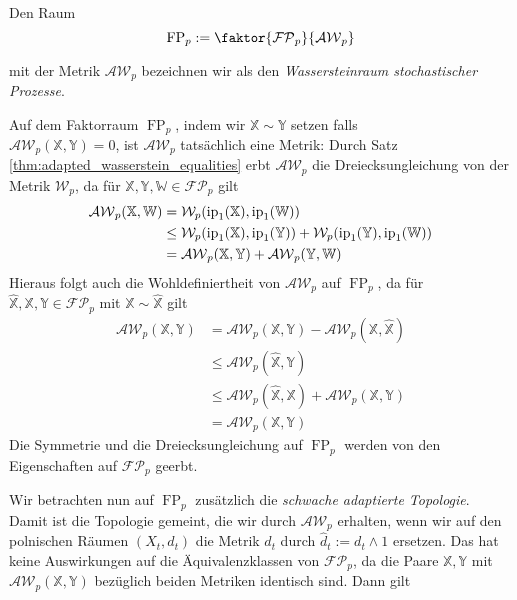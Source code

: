 \begin{definition}
    Den Raum
    $$\operatorname{FP}_p := \faktor{\mathcal{FP}_p}{\mathcal{AW}_p}$$

    mit der Metrik $\mathcal{AW}_p$ bezeichnen wir als den \emph{Wassersteinraum stochastischer Prozesse}.
\end{definition}
\begin{remark}
    Auf dem Faktorraum $\operatorname{FP}_p$, indem wir $\mathbb{X} \sim \mathbb{Y}$ setzen falls \\
     $\mathcal{AW}_p(\mathbb{X}, \mathbb{Y})=0$, ist $\mathcal{AW}_p$ tatsächlich eine Metrik: Durch Satz \ref{thm:adapted_wasserstein_equalities} erbt $\mathcal{AW}_p$ die Dreiecksungleichung von der Metrik $\mathcal{W}_p$, da für $\mathbb{X,Y,W} \in \mathcal{FP}_p$ gilt 
    \begin{align*}
        \mathcal{AW}_p(\mathbb{X,W}) &= \mathcal{W}_p(\operatorname{ip}_1(\mathbb{X}), \operatorname{ip}_1(\mathbb{W})) \\
        &\leq \mathcal{W}_p(\operatorname{ip}_1(\mathbb{X}), \operatorname{ip}_1(\mathbb{Y})) + \mathcal{W}_p(\operatorname{ip}_1(\mathbb{Y}), \operatorname{ip}_1(\mathbb{W})) \\
        &= \mathcal{AW}_p(\mathbb{X,Y}) + \mathcal{AW}_p(\mathbb{Y, W})
    \end{align*}
    Hieraus folgt auch die Wohldefiniertheit von $\mathcal{AW}_p$ auf $\operatorname{FP}_p$, da für $\hat{\mathbb{X}}, \mathbb{X,Y} \in \mathcal{FP}_p$ mit $\mathbb{X}\sim\hat{\mathbb{X}}$ gilt
    \begin{align*}
        \mathcal{AW}_p(\mathbb{X,Y}) &= \mathcal{AW}_p(\mathbb{X}, \mathbb{Y}) - \mathcal{AW}_p(\mathbb{X}, \hat{\mathbb{X}}) \\
        &\leq \mathcal{AW}_p(\hat{\mathbb{X}}, \mathbb{Y}) \\
        &\leq \mathcal{AW}_p(\hat{\mathbb{X}}, \mathbb{X}) + \mathcal{AW}_p(\mathbb{X,Y}) \\
        &= \mathcal{AW}_p(\mathbb{X,Y})
    \end{align*}
    Die Symmetrie und die Dreiecksungleichung auf $\operatorname{FP}_p$ werden von den Eigenschaften auf $\mathcal{FP}_p$ geerbt.
\end{remark}
Wir betrachten nun auf $\operatorname{FP}_p$ zusätzlich die \emph{schwache adaptierte Topologie}. Damit ist die Topologie gemeint, die wir durch $\mathcal{AW}_p$ erhalten, wenn wir auf den polnischen Räumen $(X_t, d_t)$ die Metrik $d_t$ durch $\widehat{d}_t := d_t \wedge 1$ ersetzen. Das hat keine Auswirkungen auf die Äquivalenzklassen von $\mathcal{FP}_p$, da die Paare $\mathbb{X,Y}$ mit $\mathcal{AW}_p(\mathbb{X,Y})$ bezüglich beiden Metriken identisch sind. Dann gilt
